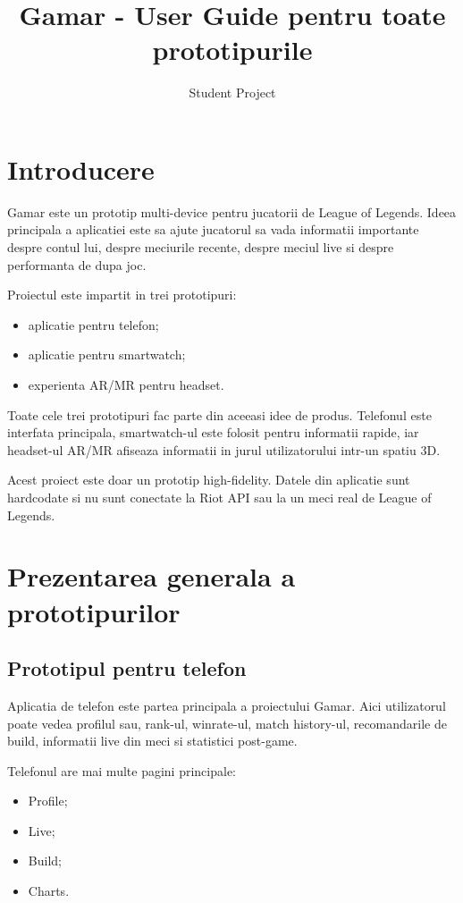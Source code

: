 \documentclass[12pt,a4paper]{article}
\title{\textbf{Gamar - User Guide pentru toate prototipurile}}
\author{Student Project}
\date{}
\begin{document}
\maketitle

\tableofcontents
\newpage

\section{Introducere}

Gamar este un prototip multi-device pentru jucatorii de League of Legends. Ideea principala a aplicatiei este sa ajute jucatorul sa vada informatii importante despre contul lui, despre meciurile recente, despre meciul live si despre performanta de dupa joc.

Proiectul este impartit in trei prototipuri:

\begin{itemize}
    \item aplicatie pentru telefon;
    \item aplicatie pentru smartwatch;
    \item experienta AR/MR pentru headset.
\end{itemize}

Toate cele trei prototipuri fac parte din aceeasi idee de produs. Telefonul este interfata principala, smartwatch-ul este folosit pentru informatii rapide, iar headset-ul AR/MR afiseaza informatii in jurul utilizatorului intr-un spatiu 3D.

Acest proiect este doar un prototip high-fidelity. Datele din aplicatie sunt hardcodate si nu sunt conectate la Riot API sau la un meci real de League of Legends.

\section{Prezentarea generala a prototipurilor}

\subsection{Prototipul pentru telefon}

Aplicatia de telefon este partea principala a proiectului Gamar. Aici utilizatorul poate vedea profilul sau, rank-ul, winrate-ul, match history-ul, recomandarile de build, informatii live din meci si statistici post-game.

Telefonul are mai multe pagini principale:

\begin{itemize}
    \item Profile;
    \item Live;
    \item Build;
    \item Charts.
\end{itemize}
\end{document}
